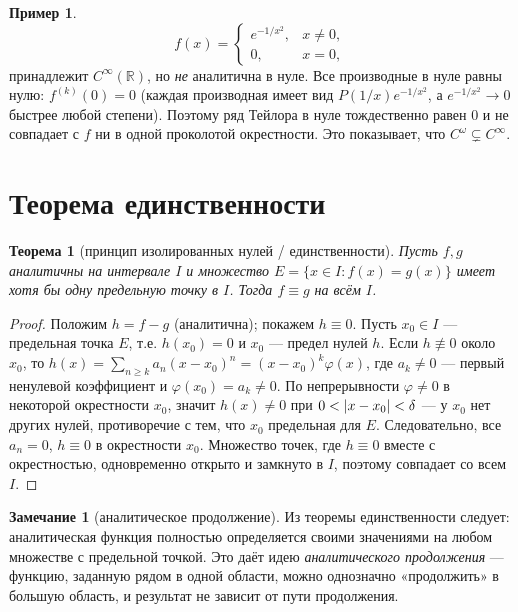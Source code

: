 \documentclass[11pt,a4paper]{article}
\theoremstyle{definition}
\newtheorem{example}[definition]{Пример}
\newtheorem{remark}[definition]{Замечание}
\theoremstyle{plain}
\newtheorem{theorem}[definition]{Теорема}
\newcommand{\R}{\mathbb{R}}
\renewcommand{\ge}{\geqslant}
\DeclarePairedDelimiter{\abs}{\lvert}{\rvert}
\begin{document}
\begin{example}
\[
  f(x)=\begin{cases}e^{-1/x^2},& x\ne0,\\ 0,& x=0,\end{cases}
\]
принадлежит $C^\infty(\R)$, но \emph{не} аналитична в нуле. Все производные в нуле равны нулю:
$f^{(k)}(0)=0$ (каждая производная имеет вид $P(1/x)e^{-1/x^2}$, а $e^{-1/x^2}\to0$ быстрее любой
степени). Поэтому ряд Тейлора в нуле тождественно равен $0$ и не совпадает с $f$ ни в одной
проколотой окрестности. Это показывает, что $C^\omega\subsetneq C^\infty$.
\end{example}

\section{Теорема единственности}

\begin{theorem}[принцип изолированных нулей / единственности]
Пусть $f,g$ аналитичны на интервале $I$ и множество $E=\{x\in I: f(x)=g(x)\}$ имеет хотя бы одну
предельную точку в $I$. Тогда $f\equiv g$ на всём $I$.
\end{theorem}

\begin{proof}
Положим $h=f-g$ (аналитична); покажем $h\equiv0$. Пусть $x_0\in I$ — предельная точка $E$, т.е.
$h(x_0)=0$ и $x_0$ — предел нулей $h$. Если $h\not\equiv0$ около $x_0$, то
$h(x)=\sum_{n\ge k}a_n(x-x_0)^n=(x-x_0)^k\varphi(x)$, где $a_k\ne0$ — первый ненулевой
коэффициент и $\varphi(x_0)=a_k\ne0$. По непрерывности $\varphi\ne0$ в некоторой окрестности
$x_0$, значит $h(x)\ne0$ при $0<\abs{x-x_0}<\delta$ — у $x_0$ нет других нулей, противоречие с
тем, что $x_0$ предельная для $E$. Следовательно, все $a_n=0$, $h\equiv0$ в окрестности $x_0$.
Множество точек, где $h\equiv0$ вместе с окрестностью, одновременно открыто и замкнуто в $I$,
поэтому совпадает со всем $I$.
\end{proof}

\begin{remark}[аналитическое продолжение]
Из теоремы единственности следует: аналитическая функция полностью определяется своими значениями
на любом множестве с предельной точкой. Это даёт идею \emph{аналитического продолжения} — функцию,
заданную рядом в одной области, можно однозначно «продолжить» в большую область, и результат не
зависит от пути продолжения.
\end{remark}
\end{document}
